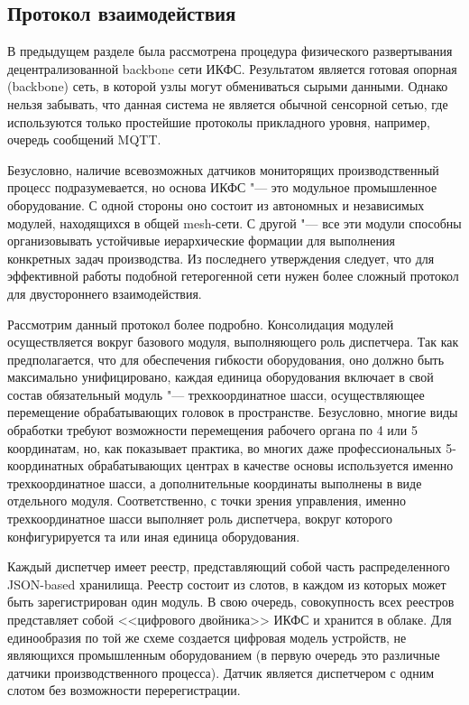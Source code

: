 \subsection{Протокол взаимодействия}

В предыдущем разделе была рассмотрена процедура физического развертывания децентрализованной backbone сети ИКФС. Результатом является готовая опорная  (backbone) сеть, в которой узлы могут обмениваться сырыми данными. Однако нельзя забывать, что данная система не является обычной сенсорной сетью, где используются только простейшие протоколы прикладного уровня, например, очередь сообщений MQTT.

Безусловно, наличие всевозможных датчиков мониторящих производственный процесс подразумевается, но основа ИКФС "--- это модульное промышленное оборудование. С одной стороны оно состоит из автономных и независимых модулей, находящихся в общей mesh-сети. С другой "--- все эти модули способны организовывать устойчивые иерархические формации для выполнения конкретных задач производства. Из последнего утверждения следует, что для эффективной работы подобной гетерогенной сети нужен более сложный протокол для двустороннего взаимодействия.

Рассмотрим данный протокол более подробно. Консолидация модулей осуществляется вокруг базового модуля, выполняющего роль диспетчера. Так как предполагается, что для обеспечения гибкости оборудования, оно должно быть максимально унифицировано, каждая единица оборудования включает в свой состав обязательный модуль "--- трехкоординатное шасси, осуществляющее перемещение обрабатывающих головок в пространстве. Безусловно, многие виды обработки требуют возможности перемещения рабочего органа по 4 или 5 координатам, но, как показывает практика, во многих даже профессиональных 5-координатных обрабатывающих центрах в качестве основы используется именно трехкоординатное шасси, а дополнительные координаты выполнены в виде отдельного модуля. Соответственно, с точки зрения управления, именно трехкоординатное шасси выполняет роль диспетчера, вокруг которого конфигурируется та или иная единица оборудования. 

Каждый диспетчер имеет реестр, представляющий собой часть распределенного JSON-based хранилища. Реестр состоит из слотов, в каждом из которых может быть зарегистрирован один модуль. В свою очередь, совокупность всех реестров представляет собой <<цифрового двойника>> ИКФС и хранится в облаке. Для единообразия по той же схеме создается цифровая модель устройств, не являющихся промышленным оборудованием (в первую очередь это различные датчики производственного процесса). Датчик является диспетчером с одним слотом без возможности перерегистрации.

